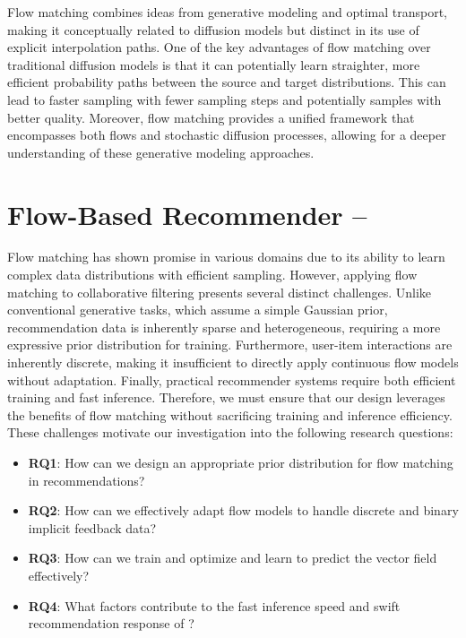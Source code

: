 \documentclass[sigconf]{acmart}
\begin{document}
Flow matching combines ideas from generative modeling and optimal transport, making it conceptually related to diffusion models but distinct in its use of explicit interpolation paths. One of the key advantages of flow matching over traditional diffusion models is that it can potentially learn straighter, more efficient probability paths between the source and target distributions. This can lead to faster sampling with fewer sampling steps and potentially samples with better quality. Moreover, flow matching provides a unified framework that encompasses both flows and stochastic diffusion processes, allowing for a deeper understanding of these generative modeling approaches.

\section{Flow-Based Recommender -- \ours}
Flow matching has shown promise in various domains due to its ability to learn complex data distributions with efficient sampling. However, applying flow matching to collaborative filtering presents several distinct challenges. Unlike conventional generative tasks, which assume a simple Gaussian prior, recommendation data is inherently sparse and heterogeneous, requiring a more expressive prior distribution for training. 
Furthermore, user-item interactions are inherently discrete, making it insufficient to directly apply continuous flow models without adaptation. 
Finally, practical recommender systems require both efficient training and fast inference.  Therefore, we must ensure that our design leverages the benefits of flow matching without sacrificing training and inference efficiency. 
These challenges motivate our investigation into the following research questions:
\begin{itemize}
 [leftmargin=*,noitemsep,topsep=1.5pt]
     \item \textbf{RQ1}: How can we design an appropriate prior distribution for flow matching in recommendations?
     \item \textbf{RQ2}: How can we effectively adapt flow models to handle discrete and binary implicit feedback data?
     \item \textbf{RQ3}: How can we train and optimize \ours and learn to predict the vector field effectively?
     \item \textbf{RQ4}: What factors contribute to the fast inference speed and swift recommendation response of \ours?
\end{itemize}
 
\end{document}
